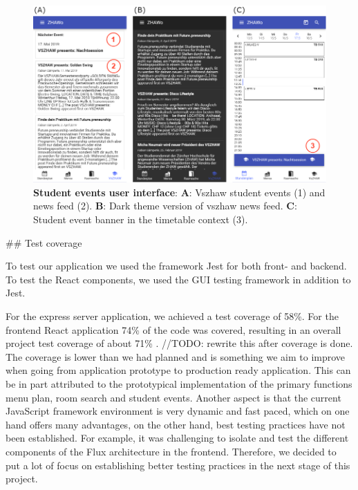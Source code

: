 \begin{markdown}
\begin{figure}[H]
  \includegraphics[width=16cm, center]{./figures/events_figure.png}
  \captionsetup{width=15.5cm}
  \caption[Student events user interface]{\textbf{Student events user interface}: \textbf{A}: Vszhaw student events (1) and news feed (2). \textbf{B}: Dark theme version of vszhaw news feed. \textbf{C}: Student event banner in the timetable context (3).}
  \label{fig:EventsFigure}
\end{figure}

\newpage

## Test coverage

To test our application we used the framework Jest \cite{Jest} for both front- and backend. To test the React components, we used the GUI testing framework \cite{Enzyme} in addition to Jest.

For the express server application, we achieved a test coverage of 58\%. For the frontend React application 74\% of the code was covered, resulting in an overall project test coverage of about 71\% \cite{OurCoverage}. 
//TODO: rewrite this after coverage is done. The coverage is lower than we had planned and is something we aim to improve when going from application prototype to production ready application. This can be in part attributed to the prototypical implementation of the primary functions menu plan, room search and student events. Another aspect is that the current JavaScript framework environment is very dynamic and fast paced, which on one hand offers many advantages, on the other hand, best testing practices have not been established. For example, it was challenging to isolate and test the different components of the Flux architecture in the frontend. Therefore, we decided to put a lot of focus on establishing better testing practices in the next stage of this project.


\end{markdown}

